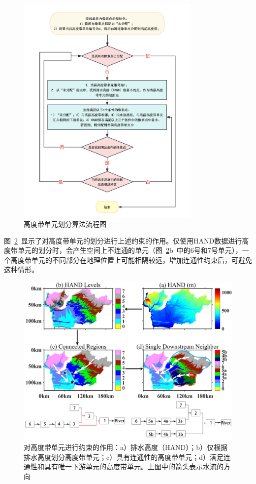 {
\begin{figure}[htbp]
\centering
\includegraphics[width=0.8\textwidth]{Figures/模式构架/高度带单元划分算法.jpg}
\caption{高度带单元划分算法流程图}
\label{fig:高度带单元算法流程}
\end{figure}
}

图~\ref{fig:高度带单元约束示意}~显示了对高度带单元的划分进行上述约束的作用。仅使用HAND数据进行高度带单元的划分时，会产生空间上不连通的单元（图~\ref{fig:高度带单元约束示意}b~中的6号和7号单元），一个高度带单元的不同部分在地理位置上可能相隔较远，增加连通性约束后，可避免这种情形。

{
\begin{figure}[htbp]
\centering
\includegraphics[width=\textwidth]{Figures/模式构架/高度带单元的约束示意图.jpg}
\caption[对高度带单元进行约束的作用]{对高度带单元进行约束的作用：a）排水高度（HAND）；b）仅根据排水高度划分高度带单元；c）具有连通性的高度带单元；d）满足连通性和具有唯一下游单元的高度带单元。上图中的箭头表示水流的方向}
\label{fig:高度带单元约束示意}
\end{figure}
}

